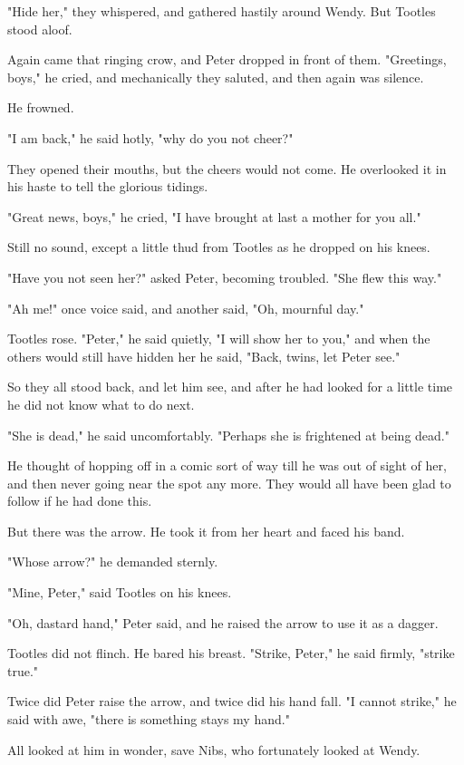 "Hide her," they whispered, and gathered hastily around Wendy.
But Tootles stood aloof.

Again came that ringing crow, and Peter dropped in front of them.
"Greetings, boys," he cried, and mechanically they saluted, and then again was silence.

He frowned.

"I am back," he said hotly, "why do you not cheer?"

They opened their mouths, but the cheers would not come.
He overlooked it in his haste to tell the glorious tidings.

"Great news, boys," he cried, "I have brought at last a mother for you all."

Still no sound, except a little thud from Tootles as he dropped on his knees.

"Have you not seen her?\@" asked Peter, becoming troubled.
"She flew this way."

"Ah me!\@" once voice said, and another said, "Oh, mournful day."

Tootles rose.
"Peter," he said quietly, "I will show her to you,"
and when the others would still have hidden her he said, "Back, twins, let Peter see."

So they all stood back, and let him see,
and after he had looked for a little time he did not know what to do next.

"She is dead," he said uncomfortably.
"Perhaps she is frightened at being dead."

He thought of hopping off in a comic sort of way till he was out of sight of her,
and then never going near the spot any more.
They would all have been glad to follow if he had done this.

But there was the arrow.
He took it from her heart and faced his band.

"Whose arrow?\@" he demanded sternly.

"Mine, Peter," said Tootles on his knees.

"Oh, dastard hand," Peter said, and he raised the arrow to use it as a dagger.

Tootles did not flinch.
He bared his breast.
"Strike, Peter," he said firmly, "strike true."

Twice did Peter raise the arrow, and twice did his hand fall.
"I cannot strike," he said with awe, "there is something stays my hand."

All looked at him in wonder, save Nibs, who fortunately looked at Wendy.

